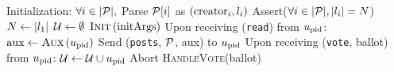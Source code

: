 \begin{algorithm}[H]
  \caption{$\gfunc\left(\textsc{Init}, \textsc{Aux},
  \textsc{HandleVote}\right)\left(\postlist, \mathrm{initArgs}\right)$}
  \label{alg:gfunc}
  \begin{algorithmic}[1]
    \State Initialization:
    \Indent
      \State $\forall i \in |\mathcal{P}|,$ Parse $\mathcal{P}[i]$ as
      $\left(\mathrm{creator}_i, l_i\right)$
      \State Assert($\forall i \in |\mathcal{P}|, |l_i| = N$)
      \State $N \gets |l_1|$
      \State $\mathcal{U} \gets \emptyset$
      \State $\textsc{Init}\left(\mathrm{initArgs}\right)$
    \EndIndent
    \State
    \State Upon receiving (\texttt{read}) from $u_{\mathrm{pid}}$:
    \Indent
      \State $\mathrm{aux} \gets \textsc{Aux}\left(u_{\mathrm{pid}}\right)$
      \State Send (\texttt{posts}, $\mathcal{P}$, aux) to $u_{\mathrm{pid}}$
    \EndIndent
    \State
    \State Upon receiving (\texttt{vote}, ballot) from
    $u_{\mathrm{pid}}$:
     \Indent
       \State $\mathcal{U} \gets \mathcal{U} \cup u_{\mathrm{pid}}$
       \If{$|\playerlist| > \playerlen$}
         \State Abort
       \EndIf
       \State \textsc{HandleVote}(ballot)
     \EndIndent
  \end{algorithmic}
\end{algorithm}
